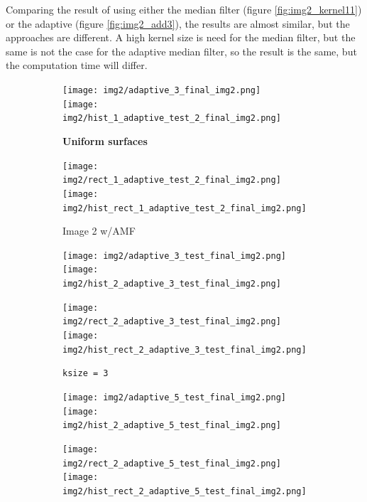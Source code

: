Comparing the result of using either the median filter (figure \ref{fig:img2_kernel11}) or the adaptive (figure \ref{fig:img2_add3}), the results are almost similar, but the approaches are different. A high kernel size is need for the median filter, but the same is not the case for the adaptive median filter, so the result is the same, but the computation time will differ.  

\begin{figure}[H]
    \centering
    \begin{subfigure}[b]{0.24\textwidth}
        \texttt{[image: img2/adaptive\_3\_final\_img2.png]}\\[0.1cm]
        \texttt{[image: img2/hist\_1\_adaptive\_test\_2\_final\_img2.png]}
        \begin{center}
        	\textbf{Uniform surfaces}
        \end{center}
        \texttt{[image: img2/rect\_1\_adaptive\_test\_2\_final\_img2.png]}\\[0.1cm]
        \texttt{[image: img2/hist\_rect\_1\_adaptive\_test\_2\_final\_img2.png]}
        \caption{Image 2 w/AMF}
        \label{fig:img2_add1}
    \end{subfigure}
    \begin{subfigure}[b]{0.24\textwidth}
        \texttt{[image: img2/adaptive\_3\_test\_final\_img2.png]}\\[0.1cm]
        \texttt{[image: img2/hist\_2\_adaptive\_3\_test\_final\_img2.png]}
        \begin{center}
        	\textbf{ }
        \end{center}
        \texttt{[image: img2/rect\_2\_adaptive\_3\_test\_final\_img2.png]}\\[0.1cm]
        \texttt{[image: img2/hist\_rect\_2\_adaptive\_3\_test\_final\_img2.png]}
        \caption{\lstinline|ksize = 3|}
        \label{fig:img2_add2}
    \end{subfigure}
    \begin{subfigure}[b]{0.24\textwidth}
        \texttt{[image: img2/adaptive\_5\_test\_final\_img2.png]}\\[0.1cm]
        \texttt{[image: img2/hist\_2\_adaptive\_5\_test\_final\_img2.png]}
        \begin{center}
        	\textbf{ }
        \end{center}
        \texttt{[image: img2/rect\_2\_adaptive\_5\_test\_final\_img2.png]}\\[0.1cm]
        \texttt{[image: img2/hist\_rect\_2\_adaptive\_5\_test\_final\_img2.png]}

\end{subfigure}
\end{figure}
